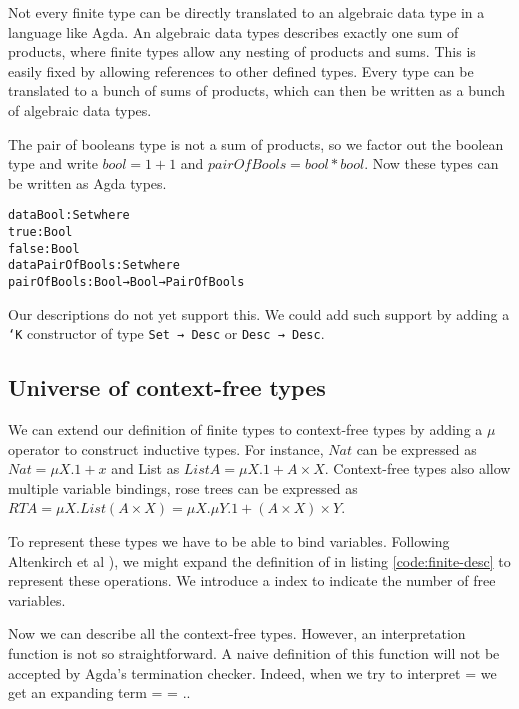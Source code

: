 Not every finite type can be directly translated to an algebraic data
type in a language like Agda.
An algebraic data types describes exactly one sum of products, where
finite types allow any nesting of products and sums.
This is easily fixed by allowing references to other defined types.
Every type can be translated to a bunch of sums of products, which can
then be written as a bunch of algebraic data types.

\begin{example}
The pair of booleans type is not a sum of products, so we factor out
the boolean type and write $bool = 1 + 1$ and $pairOfBools = bool *
bool$.
Now these types can be written as Agda types.

\begin{alltt}
data Bool : Set where
  true : Bool
  false : Bool
data PairOfBools : Set where
  pairOfBools : Bool → Bool → PairOfBools
\end{alltt}
\end{example}

Our descriptions do not yet support this.
We could add such support by adding a \texttt{`K} constructor of type
\texttt{Set → Desc} or \texttt{Desc → Desc}. 


\subsection{Universe of context-free types}\label{sec:lit-cft}

We can extend our definition of finite types to context-free types by
adding a $μ$ operator to construct inductive types.
For instance, $Nat$ can be expressed as $Nat = μX. 1 + x$ and List as $List
A = μX. 1 + A × X$.
Context-free types also allow multiple variable bindings, rose trees
can be expressed as $RT A = μX. List (A × X) = μX. μY. 1 + (A × X) × Y$.

To represent these types we have to be able to bind variables.
Following Altenkirch et al \cite{altenkirch06}), we might expand the
definition of  in listing \ref{code:finite-desc} to represent
these operations.
We introduce a  index to indicate the number of free variables.


Now we can describe all the context-free types.
However, an interpretation function  is not so
straightforward.
A naive definition of this function will not be accepted by Agda's
termination checker.
Indeed, when we try to interpret  =   
\AY{(}\AF{\#} \AY{)} we get an expanding term  
 =      = ..


